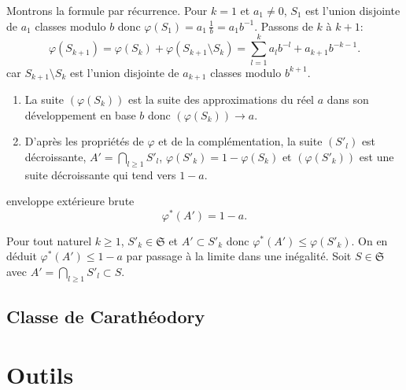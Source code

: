 \begin{demo}
Montrons la formule par récurrence.\newline
 Pour $k=1$ et $a_1 \neq 0$, $S_1$ est l'union disjointe de $a_1$ classes modulo $b$ donc $\varphi(S_1)= a_1\, \frac{1}{b} = a_1 b^{-1}$.\newline
Passons de $k$ à $k+1$:
\begin{displaymath}
 \varphi(S_{k+1}) = \varphi(S_k) + \varphi(S_{k+1} \setminus S_k)
 = \sum_{l=1}^k a_l b^{-l} + a_{k+1}b^{-k-1}.
\end{displaymath}
car $S_{k+1} \setminus S_k$ est l'union disjointe de $a_{k+1}$ classes modulo $b^{k+1}$.
\end{demo}
\begin{rems}
  \begin{enumerate}
   \item La suite $(\varphi(S_k))$ est la suite des approximations du réel $a$ dans son développement en base $b$ donc $(\varphi(S_k)) \rightarrow a$.
   \item D'après les propriétés de $\varphi$ et de la complémentation, la suite $(S'_l)$ est décroissante, $A' = \bigcap_{l\geq 1} S'_l$, $\varphi(S'_k) = 1 - \varphi(S_k)$ et
   $(\varphi(S'_k))$ est une suite décroissante qui tend vers $1-a$.
  \end{enumerate}
 \end{rems}
\begin{prop}{enveloppe extérieure brute}
 \begin{displaymath}
  \varphi^*(A') = 1 - a .
 \end{displaymath}
\end{prop}
\begin{demo}
 Pour tout naturel $k\geq 1$, $S'_k \in \mathfrak{S}$ et $A' \subset S'_k$ donc $\varphi^*(A') \leq \varphi(S'_k)$. On en déduit $\varphi^*(A') \leq 1-a$ par passage à la limite dans une inégalité.\newline
 Soit $S \in \mathfrak{S}$ avec  $A'= \bigcap_{l\geq 1} S'_l \subset S$.
\end{demo}
\section{Classe de Carathéodory} \label{ClasseCaratheodory}

\chapter{Outils} \label{Chap:Outils}


